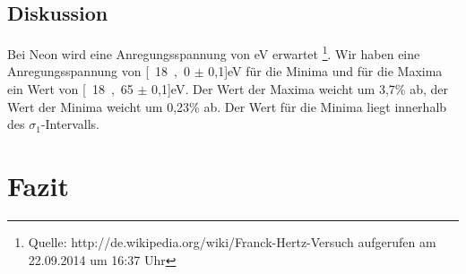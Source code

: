 \documentclass[12pt,a4paper]{article}
\begin{document}
\subsection{Diskussion}

Bei Neon wird eine Anregungsspannung von \unit[18,4 bis 19,0]{eV} erwartet \footnote{Quelle: http://de.wikipedia.org/wiki/Franck-Hertz-Versuch aufgerufen am 22.09.2014 um 16:37 Uhr}. Wir haben eine Anregungsspannung von \unit[18,0 $\pm$ 0,1]{eV} für die Minima und für die Maxima ein Wert von \unit[18,65 $\pm$ 0,1]{eV}. Der Wert der Maxima weicht um 3,7\% ab, der Wert der Minima weicht um 0,23\% ab. Der Wert für die Minima liegt innerhalb des $\sigma_1$-Intervalls.

\section{Fazit}
\end{document}
